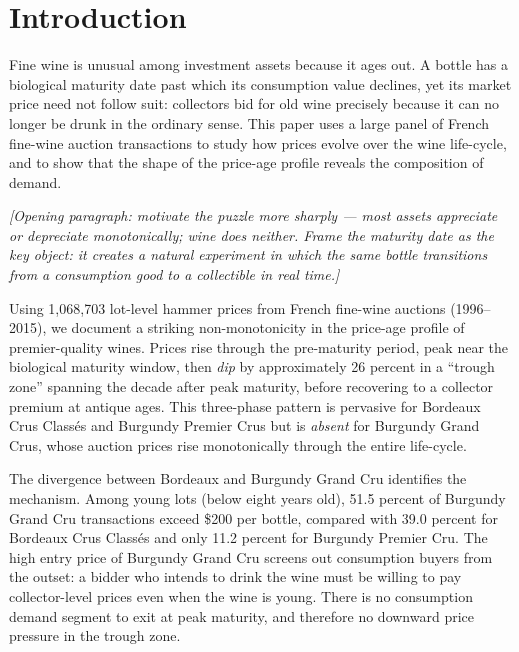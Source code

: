 
\section{Introduction}
\label{sec:intro}

Fine wine is unusual among investment assets because it ages out. A bottle has a biological
maturity date past which its consumption value declines, yet its market price need not follow
suit: collectors bid for old wine precisely because it can no longer be drunk in the ordinary
sense. This paper uses a large panel of French fine-wine auction transactions to study how
prices evolve over the wine life-cycle, and to show that the shape of the price-age profile
reveals the composition of demand.

\noindent\textit{[Opening paragraph: motivate the puzzle more sharply — most assets appreciate
or depreciate monotonically; wine does neither. Frame the maturity date as the key object:
it creates a natural experiment in which the same bottle transitions from a consumption good
to a collectible in real time.]}

Using 1,068,703 lot-level hammer prices from French fine-wine auctions (1996--2015), we
document a striking non-monotonicity in the price-age profile of premier-quality wines.
Prices rise through the pre-maturity period, peak near the biological maturity window, then
\textit{dip} by approximately 26 percent in a ``trough zone'' spanning the decade after
peak maturity, before recovering to a collector premium at antique ages. This three-phase
pattern is pervasive for Bordeaux Crus Class\'es and Burgundy Premier Crus but is
\textit{absent} for Burgundy Grand Crus, whose auction prices rise monotonically through
the entire life-cycle.

The divergence between Bordeaux and Burgundy Grand Cru identifies the mechanism.
Among young lots (below eight years old), 51.5 percent of Burgundy Grand Cru transactions
exceed \$200 per bottle, compared with 39.0 percent for Bordeaux Crus Class\'es and only
11.2 percent for Burgundy Premier Cru. The high entry price of Burgundy Grand Cru screens
out consumption buyers from the outset: a bidder who intends to drink the wine must be
willing to pay collector-level prices even when the wine is young. There is no consumption
demand segment to exit at peak maturity, and therefore no downward price pressure in the
trough zone.

